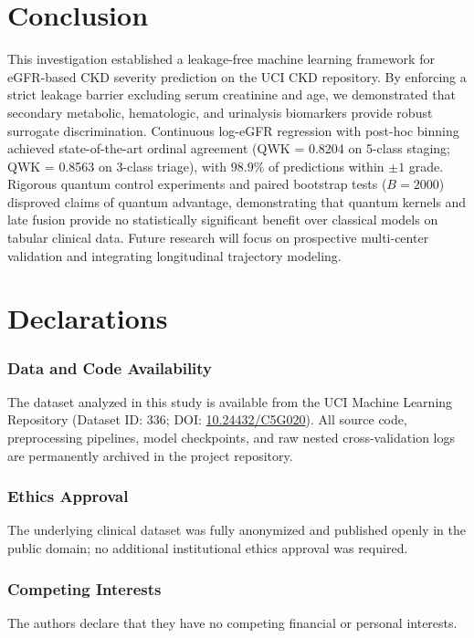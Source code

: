 \documentclass[conference]{IEEEtran}
\begin{document}
\section{Conclusion}

This investigation established a leakage-free machine learning framework for eGFR-based CKD severity prediction on the UCI CKD repository. By enforcing a strict leakage barrier excluding serum creatinine and age, we demonstrated that secondary metabolic, hematologic, and urinalysis biomarkers provide robust surrogate discrimination. Continuous log-eGFR regression with post-hoc binning achieved state-of-the-art ordinal agreement (QWK = 0.8204 on 5-class staging; QWK = 0.8563 on 3-class triage), with $98.9\%$ of predictions within $\pm 1$ grade. Rigorous quantum control experiments and paired bootstrap tests ($B = 2000$) disproved claims of quantum advantage, demonstrating that quantum kernels and late fusion provide no statistically significant benefit over classical models on tabular clinical data. Future research will focus on prospective multi-center validation and integrating longitudinal trajectory modeling.

\section*{Declarations}

\subsubsection*{Data and Code Availability}
The dataset analyzed in this study is available from the UCI Machine Learning Repository (Dataset ID: 336; DOI: \url{10.24432/C5G020}). All source code, preprocessing pipelines, model checkpoints, and raw nested cross-validation logs are permanently archived in the project repository.

\subsubsection*{Ethics Approval}
The underlying clinical dataset was fully anonymized and published openly in the public domain; no additional institutional ethics approval was required.

\subsubsection*{Competing Interests}
The authors declare that they have no competing financial or personal interests.
\end{document}
